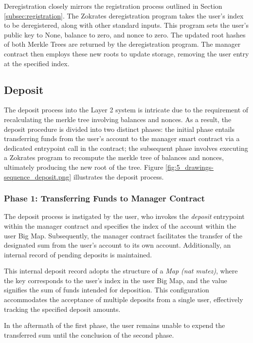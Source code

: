 Deregistration closely mirrors the registration process outlined in Section \ref{subsec:registration}. The Zokrates deregistration program takes the user's index to be deregistered, along with other standard inputs. This program sets the user's public key to None, balance to zero, and nonce to zero. The updated root hashes of both Merkle Trees are returned by the deregistration program. The manager contract then employs these new roots to update storage, removing the user entry at the specified index.

\subsection{Deposit\label{subsec:deposit}}
The deposit process into the Layer 2 system is intricate due to the requirement of recalculating the merkle tree involving balances and nonces. As a result, the deposit procedure is divided into two distinct phases: the initial phase entails transferring funds from the user's account to the manager smart contract via a dedicated entrypoint call in the contract; the subsequent phase involves executing a Zokrates program to recompute the merkle tree of balances and nonces, ultimately producing the new root of the tree. Figure \ref{fig:5_drawings-sequence_deposit.png} illustrates the deposit process.

\subsubsection{Phase 1: Transferring Funds to Manager Contract}
The deposit process is instigated by the user, who invokes the \textit{deposit} entrypoint within the manager contract and specifies the index of the account within the user Big Map. Subsequently, the manager contract facilitates the transfer of the designated sum from the user's account to its own account. Additionally, an internal record of pending deposits is maintained.

This internal deposit record adopts the structure of a \textit{Map (nat mutez)}, where the key corresponds to the user's index in the user Big Map, and the value signifies the sum of funds intended for deposition. This configuration accommodates the acceptance of multiple deposits from a single user, effectively tracking the specified deposit amounts.

In the aftermath of the first phase, the user remains unable to expend the transferred sum until the conclusion of the second phase.

